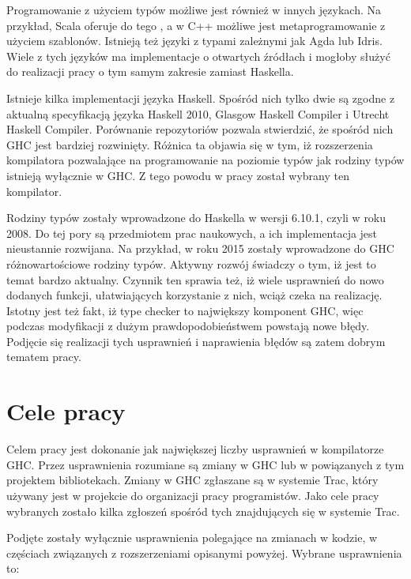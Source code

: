 Programowanie z użyciem typów możliwe jest również w innych językach. Na przykład,
Scala oferuje do tego , a w C++ możliwe jest
metaprogramowanie z użyciem szablonów. Istnieją też języki z typami zależnymi
jak Agda lub Idris. Wiele z tych języków ma implementacje o otwartych źródłach i
mogłoby służyć do realizacji pracy o tym samym zakresie zamiast Haskella.

Istnieje kilka implementacji języka Haskell. Spośród nich tylko dwie są zgodne z
aktualną specyfikacją języka Haskell 2010, Glasgow Haskell Compiler i Utrecht
Haskell Compiler\cite{WikiImplementations}. Porównanie repozytoriów pozwala
stwierdzić, że spośród nich GHC jest bardziej rozwinięty. Różnica ta objawia się
w tym, iż rozszerzenia kompilatora pozwalające na programowanie na poziomie
typów jak rodziny typów istnieją wyłącznie w GHC\cite{UHCUserGuide}. Z tego
powodu w pracy został wybrany ten kompilator.

Rodziny typów zostały wprowadzone do Haskella w wersji 6.10.1, czyli w roku
2008\cite{WikiIndexedTypes}. Do tej pory są przedmiotem prac naukowych, a ich implementacja jest
nieustannie rozwijana. Na przykład, w roku 2015 zostały wprowadzone do GHC
różnowartościowe rodziny typów. Aktywny rozwój świadczy o tym, iż jest to
temat bardzo aktualny. Czynnik ten sprawia też, iż wiele usprawnień do
nowo dodanych funkcji, ułatwiających korzystanie z nich, wciąż czeka na realizację.
Istotny jest też fakt, iż type checker to największy komponent GHC\cite{AOSA},
więc podczas modyfikacji z dużym prawdopodobieństwem powstają nowe błędy.
Podjęcie się realizacji tych usprawnień i naprawienia błędów są zatem dobrym tematem pracy.

\section{Cele pracy}\label{sec:cele_pracy}

Celem pracy jest dokonanie jak największej liczby usprawnień w kompilatorze
GHC. Przez usprawnienia rozumiane są zmiany w GHC lub w powiązanych z tym
projektem bibliotekach. Zmiany w GHC zgłaszane są w systemie Trac, który
używany jest w projekcie do organizacji pracy programistów. Jako cele pracy
wybranych zostało kilka zgłoszeń spośród tych znajdujących się w systemie Trac.

Podjęte zostały wyłącznie usprawnienia polegające na zmianach w
kodzie, w częściach związanych z rozszerzeniami opisanymi powyżej. Wybrane
usprawnienia to:

